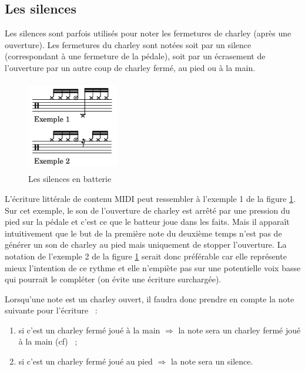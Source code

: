 \subsection*{Les silences}
Les silences sont parfois utilisés pour noter les fermetures de charley (après
une ouverture). Les fermetures du charley sont notées soit par un silence
(correspondant à une fermeture de la pédale), soit par un écrasement de
l’ouverture par un autre coup de charley fermé, au pied ou à la main.

\begin{figure}[h]
	\centering
	\includegraphics[height=40mm, width=40mm]{
    z_images/3_methodes/0_notation_de_la_batterie/5_silence_joue.png}
	\caption{Les silences en batterie}
	\label{silence joue}
\end{figure}

L’écriture littérale de contenu MIDI peut ressembler à l’exemple 1 de la figure
\ref{silence joue}. Sur cet exemple, le son de l’ouverture de charley est
arrêté par une pression du pied sur la pédale et c’est ce que le batteur joue
dans les faits. Mais il apparaît intuitivement que le but de la première note
du deuxième temps n’est pas de générer un son de charley au pied mais
uniquement de stopper l’ouverture. La notation de l’exemple 2 de la figure
\ref{silence joue} serait donc préférable car elle représente mieux l’intention
de ce rythme et elle n’empiète pas sur une potentielle voix basse qui pourrait
le compléter (on évite une écriture surchargée).

Lorsqu’une note est un charley ouvert, il faudra donc prendre en compte la note
suivante pour l’écriture~ :
\begin{enumerate}
    \item si c’est un charley fermé joué à la main $\Rightarrow$ la note sera
        un charley fermé joué à la main (cf)~ ;
    \item si c’est un charley fermé joué au pied $\Rightarrow$ la note sera un
        silence.
\end{enumerate}

